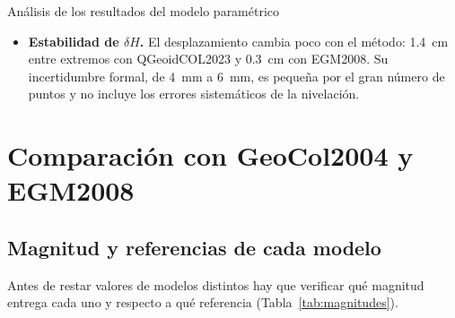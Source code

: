 \documentclass[11pt,letterpaper]{article}
\begin{document}
\begin{analisisBox}{Análisis de los resultados del modelo paramétrico}
\begin{itemize}
\begin{itemize}
        ($\hat\sigma_0=\SI{0.31}{m}$). El exponente que mejor reconstruye la propia malla no es
        necesariamente el que mejor representa $N$ en los puntos nivelados;
        \item el kriging suaviza el campo y casi anula la inclinación este--oeste.
    \end{itemize}
    Con EGM2008 (paso de $2'$) la malla es más densa y todos los métodos, salvo el vecino más
    cercano y el IDW, quedan prácticamente empatados: $R^2_{aj}$ entre $0{,}3897$ y $0{,}3923$, y
    la bilineal tiene un $\hat\sigma_0$ apenas \SI{0.8}{mm} menor que la bicúbica.
    \item \textbf{Estabilidad de $\delta H$.} El desplazamiento cambia poco con el método:
    \SI{1.4}{cm} entre extremos con QGeoidCOL2023 y \SI{0.3}{cm} con EGM2008. Su incertidumbre
    formal, de \SI{4}{mm} a \SI{6}{mm}, es pequeña por el gran número de puntos y no incluye los
    errores sistemáticos de la nivelación.
\end{itemize}
\end{analisisBox}








\section{Comparación con GeoCol2004 y EGM2008}
\label{sec:modelos}

\subsection{Magnitud y referencias de cada modelo}
Antes de restar valores de modelos distintos hay que verificar qué magnitud entrega
cada uno y respecto a qué referencia (Tabla~\ref{tab:magnitudes}).
\end{document}
